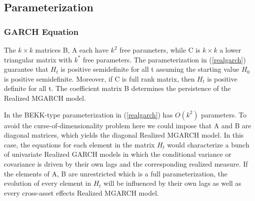 \documentclass[titlepage,11pt]{article}
\begin{document}
\subsection{Parameterization}
\subsubsection{GARCH Equation}
The $k \times k$ matrices B, A each have $k^2$ free parameters, while C is $k \times k$ a lower triangular matrix with $k^*$ free parameters. The parameterization in (\ref{realgarch}) guarantee that $ H_t$ is positive semidefinite for all t assuming the starting value $H_0$ is positive semidefinite. Moreover, if C is full rank matrix, then $H_t$ is positive definite for all t. The coefficient matrix B determines the persistence of the Realized MGARCH model. 

In the BEKK-type parameterization in (\ref{realgarch}) has $O(k^2)$ parameters. To avoid the curse-of-dimensionality problem here we could impose that A and B are diagonal matrices, which yields the diagonal Realized MGARCH model. In this case, the equations for each element in the matrix $H_t$ would characterize a bunch of univariate Realized GARCH models in which the conditional variance or covariance is driven by their own lags and the corresponding realized measure. If the elements of A, B are unrestricted which is a full parameterization, the evolution of every element in $H_t$ will be influenced by their own lags as well as every cross-asset effects Realized MGARCH model. 
\end{document}
